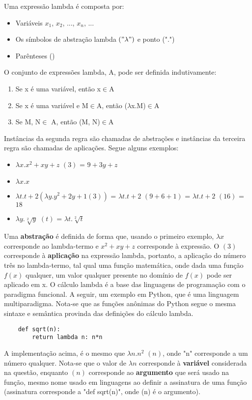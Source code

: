 \documentclass{article}
\begin{document}
Uma expressão lambda é composta por:
\begin{itemize}
    \item Variáveis $x_{1}$, $x_{2}$, ..., $x_{n}$, ...
    \item Os símbolos de abstração lambda $("\lambda")$ e ponto (".")
    \item Parênteses ()
\end{itemize}
O conjunto de expressões lambda, A, pode ser definida indutivamente:
\begin{enumerate}
    \item Se x é uma variável, então x$\in$A
    \item Se x é uma variável e M$\in$A, então ($\lambda$x.M)$\in$A
    \item Se M, N$\in$ A, então (M, N)$\in$A
\end{enumerate}
Instâncias da segunda regra são chamadas de abstrações e instâncias da terceira regra são chamadas de aplicações. Segue alguns exemplos:
\begin{itemize}
    \item $\lambda x.x^{2}+xy+z$ $(3)$ = $9+3y+z$
    \item $\lambda x.x$
    \item $\lambda t.t + 2(\lambda y.y^{2} + 2y + 1 (3))$ = $\lambda t.t + 2$ $(9+6+1)$  = $\lambda t.t + 2$ $(16)$ = $18$
    \item $\lambda y.\sqrt[2]{y}$ $(t)$ = $\lambda t.\sqrt[2]{t}$
\end{itemize}
Uma \textbf{abstração} é definida de forma que, usando o primeiro exemplo, $\lambda x$ corresponde ao lambda-termo e $x^{2}+xy+z$ corresponde à expressão. O $(3)$ corresponde à \textbf{aplicação} na expressão lambda, portanto, a aplicação do número três no lambda-termo, tal qual uma função matemática, onde dada uma função $f(x)$ qualquer, um valor qualquer presente no domínio de $f(x)$ pode ser aplicado em x. O cálculo lambda é a base das linguagens de programação com o paradigma funcional. A seguir, um exemplo em Python, que é uma linguagem multiparadigma. Nota-se que as funções anônimas do Python segue o mesma sintaxe e semântica provinda das definições do cálculo lambda.
    \begin{lstlisting}
    def sqrt(n):
        return lambda n: n*n
    \end{lstlisting}
A implementação acima, é o mesmo que $\lambda n. n^{2}$ $(n)$, onde "n" corresponde a um número qualquer. Nota-se que o valor de $\lambda n$ corresponde à \textbf{variável} considerada na questão, enquanto $(n)$ corresponde ao \textbf{argumento} que será usado na função, mesmo nome usado em linguagens ao definir a assinatura de uma função (assinatura corresponde a "def sqrt(n)", onde (n) é o argumento).
\end{document}
